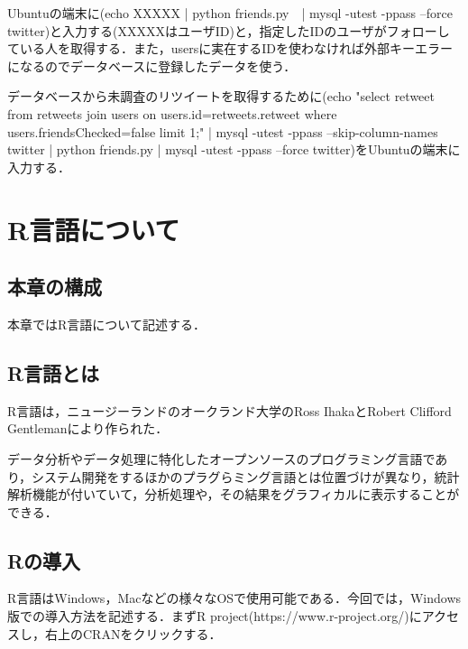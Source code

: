 Ubuntuの端末に(echo XXXXX | python friends.py　| mysql -utest -ppass --force twitter)と入力する(XXXXXはユーザID)と，指定したIDのユーザがフォローしている人を取得する．また，usersに実在するIDを使わなければ外部キーエラーになるのでデータベースに登録したデータを使う．

データベースから未調査のリツイートを取得するために(echo "select retweet from retweets join users on users.id=retweets.retweet where users.friendsChecked=false limit 1;" | mysql -utest -ppass --skip-column-names twitter | python friends.py | mysql -utest -ppass --force twitter)をUbuntuの端末に入力する．


\chapter{R言語について}
\section{本章の構成}
本章ではR言語について記述する．

\section{R言語とは}
R言語は，ニュージーランドのオークランド大学のRoss IhakaとRobert Clifford Gentlemanにより作られた．\cite{Rgengo}

データ分析やデータ処理に特化したオープンソースのプログラミング言語であり，システム開発をするほかのプラグらミング言語とは位置づけが異なり，統計解析機能が付いていて，分析処理や，その結果をグラフィカルに表示することができる\cite{Rsetumei}．

\section{Rの導入}

R言語はWindows，Macなどの様々なOSで使用可能である．今回では，Windows版での導入方法を記述する．まずR project(https://www.r-project.org/)にアクセスし，右上のCRANをクリックする．



